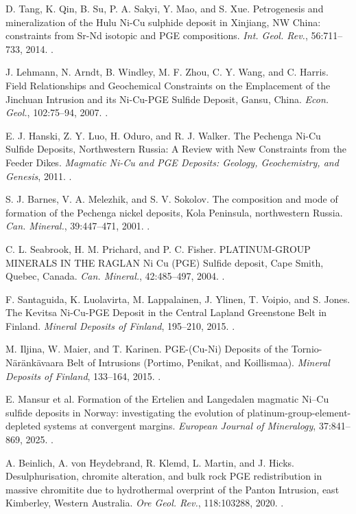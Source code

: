  D. Tang, K. Qin, B. Su, P. A. Sakyi, Y. Mao, and S. Xue. Petrogenesis and mineralization of the Hulu Ni-Cu sulphide deposit in Xinjiang, NW China: constraints from Sr-Nd isotopic and PGE compositions. \textit{Int. Geol. Rev.}, 56:711--733, 2014. .

 J. Lehmann, N. Arndt, B. Windley, M. F. Zhou, C. Y. Wang, and C. Harris. Field Relationships and Geochemical Constraints on the Emplacement of the Jinchuan Intrusion and its Ni-Cu-PGE Sulfide Deposit, Gansu, China. \textit{Econ. Geol.}, 102:75--94, 2007. .

 E. J. Hanski, Z. Y. Luo, H. Oduro, and R. J. Walker. The Pechenga Ni-Cu Sulfide Deposits, Northwestern Russia: A Review with New Constraints from the Feeder Dikes. \textit{Magmatic Ni-Cu and PGE Deposits: Geology, Geochemistry, and Genesis}, 2011. .

 S. J. Barnes, V. A. Melezhik, and S. V. Sokolov. The composition and mode of formation of the Pechenga nickel deposits, Kola Peninsula, northwestern Russia. \textit{Can. Mineral.}, 39:447--471, 2001. .

 C. L. Seabrook, H. M. Prichard, and P. C. Fisher. PLATINUM-GROUP MINERALS IN THE RAGLAN Ni Cu (PGE) Sulfide deposit, Cape Smith, Quebec, Canada. \textit{Can. Mineral.}, 42:485--497, 2004. .

 F. Santaguida, K. Luolavirta, M. Lappalainen, J. Ylinen, T. Voipio, and S. Jones. The Kevitsa Ni-Cu-PGE Deposit in the Central Lapland Greenstone Belt in Finland. \textit{Mineral Deposits of Finland}, 195--210, 2015. .

 M. Iljina, W. Maier, and T. Karinen. PGE-(Cu-Ni) Deposits of the Tornio-Näränkävaara Belt of Intrusions (Portimo, Penikat, and Koillismaa). \textit{Mineral Deposits of Finland}, 133--164, 2015. .

 E. Mansur et al. Formation of the Ertelien and Langedalen magmatic Ni--Cu sulfide deposits in Norway: investigating the evolution of platinum-group-element-depleted systems at convergent margins. \textit{European Journal of Mineralogy}, 37:841--869, 2025. .

 A. Beinlich, A. von Heydebrand, R. Klemd, L. Martin, and J. Hicks. Desulphurisation, chromite alteration, and bulk rock PGE redistribution in massive chromitite due to hydrothermal overprint of the Panton Intrusion, east Kimberley, Western Australia. \textit{Ore Geol. Rev.}, 118:103288, 2020. .


